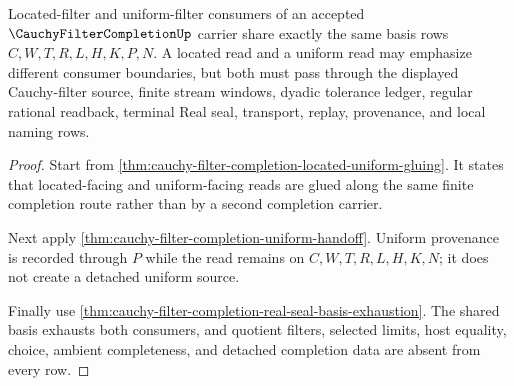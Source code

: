 \begin{theorem}
\label{thm:cauchy-filter-completion-located-uniform-basis}
Located-filter and uniform-filter consumers of an accepted $\CauchyFilterCompletionUp$ carrier share exactly the same basis rows $C,W,T,R,L,H,K,P,N$. A located read and a uniform read may emphasize different consumer boundaries, but both must pass through the displayed Cauchy-filter source, finite stream windows, dyadic tolerance ledger, regular rational readback, terminal Real seal, transport, replay, provenance, and local naming rows.
\end{theorem}
\begin{proof}
Start from \autoref{thm:cauchy-filter-completion-located-uniform-gluing}. It states that located-facing and uniform-facing reads are glued along the same finite completion route rather than by a second completion carrier.

Next apply \autoref{thm:cauchy-filter-completion-uniform-handoff}. Uniform provenance is recorded through $P$ while the read remains on $C,W,T,R,L,H,K,N$; it does not create a detached uniform source.

Finally use \autoref{thm:cauchy-filter-completion-real-seal-basis-exhaustion}. The shared basis exhausts both consumers, and quotient filters, selected limits, host equality, choice, ambient completeness, and detached completion data are absent from every row.
\end{proof}

